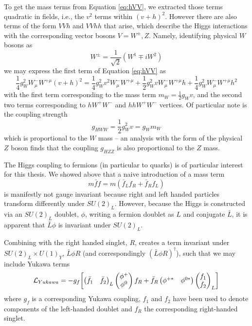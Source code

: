 To get the mass terms from Equation \ref{eq:hVV}, we extracted those terms quadratic in fields, i.e., the
$v^2$ terms within $(v+h)^2$. However there are also terms of the form $VVh$ and $VVhh$ that arise, which 
describe the Higgs interactions with the corresponding vector bosons $V = W^{\pm}, Z$. Namely, identifying 
physical $W$ bosons as
\begin{equation}
W^{\pm} = \frac{1}{\sqrt{2}}(W^1\mp iW^2)
\end{equation}
we may express the first term of Equation \ref{eq:hVV} as 
\begin{equation}
\frac{1}{4}g_{W}^2W^{-}_{\mu}W^{+ \mu}(v+h)^2 = 
\frac{1}{4}g_{W}^2v^2W^{-}_{\mu}W^{+ \mu}+\frac{1}{2}g_{W}^2vW^{-}_{\mu}W^{+ \mu}h + 
\frac{1}{4}g_{W}^2W^{-}_{\mu}W^{+ \mu}h^2
\end{equation}
with the first term corresponding to the mass term $m_{W} = \frac{1}{2}g_{W}v$, and 
the second two terms corresponding to $hW^{+}W^{-}$ and $hhW^{+}W^{-}$ vertices. Of particular 
note is the coupling strength
\begin{equation}
g_{HWW} = \frac{1}{2}g_{W}^2v = g_{W}m_{W}
\end{equation}
which is proportional to the $W$ mass -- an analysis with the form of the 
physical $Z$ boson finds that the coupling $g_{HZZ}$ is also proportional to the $Z$ 
mass.

The Higgs coupling to fermions (in particular to quarks) is of particular interest for this thesis. 
We showed above that a naive introduction of a mass term 
\begin{equation}
m\bar{f}f = m(\bar{f}_{L}f_{R} + \bar{f}_Rf_{L})
\end{equation}
is manifestly not gauge invariant because right and left handed particles transform differently 
under $SU(2)_L$. However, because the Higgs is constructed via an $SU(2)_L$ doublet, $\phi$, 
writing a fermion doublet as $L$ and conjugate $\bar{L}$, it is apparent that $\bar{L}\phi$ is 
invariant under $SU(2)_L$. 

Combining with the right handed singlet, $R$, creates a term invariant under $SU(2)_{L} \times U(1)_{Y}$, 
$\bar{L}\phi R$ (and correspondingly $(\bar{L}\phi R)^{\dagger}$), such that we may include Yukawa 
terms
\begin{equation}
\mathcal{L}_{Yukawa} = -g_{f}\qty[\begin{pmatrix}\bar{f}_{1} &\bar{f}_2\end{pmatrix}_L 
\begin{pmatrix}\phi^{+}\\\phi^{0}\end{pmatrix}f_R +
\bar{f}_R\begin{pmatrix}\phi^{+*} & \phi^{0*}\end{pmatrix}\begin{pmatrix}f_{1} \\f_2\end{pmatrix}_L]
\end{equation}
where $g_{f}$ is a corresponding Yukawa coupling, $f_{1}$ and $f_{2}$ have been used to denote 
components of the left-handed doublet and $f_{R}$ the corresponding right-handed singlet.

